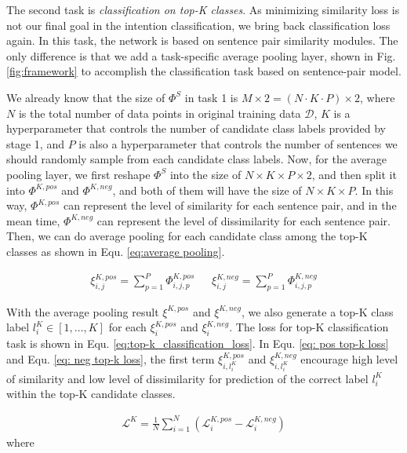 \documentclass[letterpaper]{article} %
\begin{document}
  The  second  task  is  \emph{classification  on  top-K classes}. As minimizing
  similarity  loss  is  not  our  final goal in the intention classification, we
  bring  back  classification  loss again. In this task, the network is based on
  sentence  pair  similarity  modules.  The  only  difference  is  that we add a
  task-specific  average  pooling  layer,  shown  in Fig. \ref{fig:framework} to
  accomplish the classification task based on sentence-pair model.

  We  already  know  that the size of ${\Phi}^S$ in task 1 is $M\times 2=(N\cdot
  K\cdot  P)\times  2$, where $N$ is the total number of data points in original
  training  data $\mathcal{D}$, $K$ is a hyperparameter that controls the number
  of   candidate   class  labels  provided  by  stage  1,  and  $P$  is  also  a
  hyperparameter that controls the number of sentences we should randomly sample
  from each candidate class labels. Now, for the average pooling layer, we first
  reshape  ${\Phi}^S$  into  the  size  of $N\times K\times P\times 2$, and then
  split  it  into  ${\Phi}^{K,pos}$  and ${\Phi}^{K,neg}$, and both of them will
  have  the  size  of  $N\times  K\times  P$.  In this way, ${\Phi}^{K,pos}$ can
  represent  the  level  of  similarity  for each sentence pair, and in the mean
  time,  ${\Phi}^{K,neg}$  can  represent  the  level  of dissimilarity for each
  sentence  pair. Then, we can do average pooling for each candidate class among
  the  top-K  classes  as  shown  in  Equ.  \ref{eq:average  pooling}.

  \begin{align}
    {\xi}_{i,j}^{K,pos} = \sum_{p=1}^{P}{\varPhi}_{i,j,p}^{K,pos} \ \ \ \ \ \ \ 
    {\xi}_{i,j}^{K,neg} = \sum_{p=1}^{P}{\varPhi}_{i,j,p}^{K,neg}
    \label{eq:average pooling}
  \end{align}

  With  the  average pooling result ${\xi}^{K,pos}$ and ${\xi}^{K,neg}$, we also
  generate   a   top-K   class   label   $l^{K}_i\in   [1,\dots,K]$   for   each
  ${\xi}^{K,pos}_{i}$ and ${\xi}^{K,neg}_{i}$. The loss for top-K classification
  task is shown in Equ. \ref{eq:top-k_classification_loss}. In Equ. \ref{eq: pos
  top-k   loss}   and   Equ.   \ref{eq:   neg   top-k   loss},  the  first  term
  $\xi_{i,l^{K}_{i}}^{K,pos}$  and  $\xi_{i,l^{K}_{i}}^{K,neg}$  encourage  high
  level  of  similarity  and  low  level  of dissimilarity for prediction of the
  correct label $l^{K}_i$ within the top-K candidate classes.

  \begin{align}
    \mathcal{L}^{K} = \frac{1}{N}\sum_{i=1}^{N}(\mathcal{L}^{K,pos}_{i} - \mathcal{L}^{K,neg}_{i})
    \label{eq:top-k_classification_loss}
  \end{align}
  where
\end{document}
